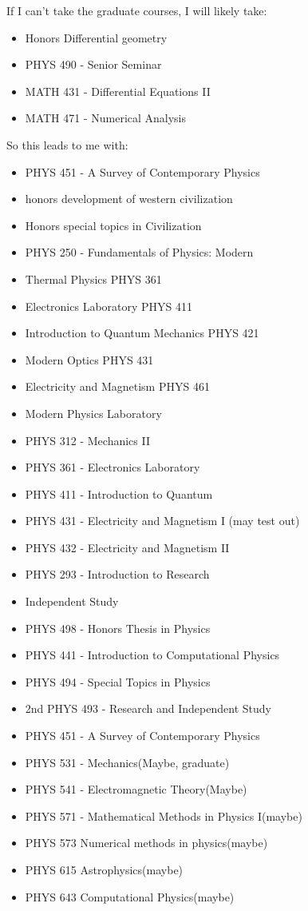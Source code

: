 \par If I can't take the graduate courses, I will likely take:
\begin{itemize}
    \item Honors Differential geometry 
    \item PHYS 490 - Senior Seminar
    \item MATH 431 - Differential Equations II 
    \item MATH 471 - Numerical Analysis
\end{itemize}
\par So this leads to me with:
\begin{itemize}
    \item PHYS 451 - A Survey of Contemporary Physics
    \item honors development of western civilization
    \item Honors special topics in Civilization
    \item PHYS 250 - Fundamentals of Physics: Modern 
    \item Thermal Physics PHYS 361 
    \item Electronics Laboratory PHYS 411 
    \item Introduction to Quantum Mechanics PHYS 421 
    \item Modern Optics PHYS 431 
    \item Electricity and Magnetism PHYS 461 
    \item Modern Physics Laboratory
    \item PHYS 312 - Mechanics II 
    \item PHYS 361 - Electronics Laboratory 
    \item PHYS 411 - Introduction to Quantum  
    \item PHYS 431 - Electricity and Magnetism I (may test out)
    \item PHYS 432 - Electricity and Magnetism II \item PHYS 293 - Introduction to Research  \item Independent Study
    \item PHYS 498 - Honors Thesis in Physics
    \item PHYS 441 - Introduction to Computational Physics
    \item PHYS 494 - Special Topics in Physics 
    \item 2nd PHYS 493 - Research and Independent Study 
    \item PHYS 451 - A Survey of Contemporary Physics
    \item PHYS 531 - Mechanics(Maybe, graduate)
    \item PHYS 541 - Electromagnetic Theory(Maybe)
    \item PHYS 571 - Mathematical Methods in Physics I(maybe)
    \item PHYS 573 Numerical methods in physics(maybe)
    \item PHYS 615 Astrophysics(maybe)
    \item PHYS 643 Computational Physics(maybe)
\end{itemize}
